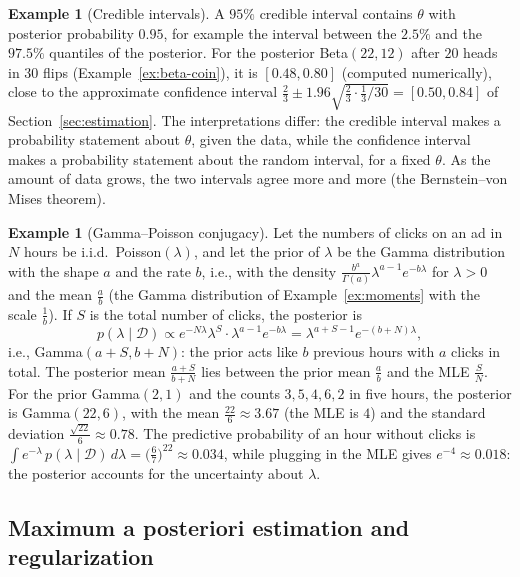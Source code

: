 \documentclass[11pt]{article}
\theoremstyle{definition}
\newtheorem{example}[definition]{Example}
\theoremstyle{plain}
\theoremstyle{remark}
\begin{document}
\begin{example}[Credible intervals]\label{ex:credible}
    A $95\%$ credible interval contains $\theta$ with posterior probability $0.95$, for example the interval between the $2.5\%$ and the $97.5\%$ quantiles of the posterior. For the posterior Beta$(22, 12)$ after $20$ heads in $30$ flips (Example~\ref{ex:beta-coin}), it is $[0.48, 0.80]$ (computed numerically), close to the approximate confidence interval $\frac{2}{3} \pm 1.96\sqrt{\frac{2}{3} \cdot \frac{1}{3}/30} = [0.50, 0.84]$ of Section~\ref{sec:estimation}. The interpretations differ: the credible interval makes a probability statement about $\theta$, given the data, while the confidence interval makes a probability statement about the random interval, for a fixed $\theta$. As the amount of data grows, the two intervals agree more and more (the Bernstein--von Mises theorem).
\end{example}

\begin{example}[Gamma--Poisson conjugacy]\label{ex:gamma-poisson}
    Let the numbers of clicks on an ad in $N$ hours be i.i.d.\ Poisson$(\lambda)$, and let the prior of $\lambda$ be the Gamma distribution with the shape $a$ and the rate $b$, i.e., with the density $\frac{b^a}{\Gamma(a)}\lambda^{a-1}e^{-b\lambda}$ for $\lambda > 0$ and the mean $\frac{a}{b}$ (the Gamma distribution of Example~\ref{ex:moments} with the scale $\frac{1}{b}$). If $S$ is the total number of clicks, the posterior is
    \[p(\lambda \mid \mathcal{D}) \propto e^{-N\lambda}\lambda^S \cdot \lambda^{a-1}e^{-b\lambda} = \lambda^{a + S - 1}e^{-(b + N)\lambda},\]
    i.e., Gamma$(a + S, b + N)$: the prior acts like $b$ previous hours with $a$ clicks in total. The posterior mean $\frac{a + S}{b + N}$ lies between the prior mean $\frac{a}{b}$ and the MLE $\frac{S}{N}$. For the prior Gamma$(2, 1)$ and the counts $3, 5, 4, 6, 2$ in five hours, the posterior is Gamma$(22, 6)$, with the mean $\frac{22}{6} \approx 3.67$ (the MLE is $4$) and the standard deviation $\frac{\sqrt{22}}{6} \approx 0.78$. The predictive probability of an hour without clicks is $\int e^{-\lambda}\,p(\lambda \mid \mathcal{D})\, d\lambda = \big(\frac{6}{7}\big)^{22} \approx 0.034$, while plugging in the MLE gives $e^{-4} \approx 0.018$: the posterior accounts for the uncertainty about $\lambda$.
\end{example}

\subsection{Maximum a posteriori estimation and regularization}
\end{document}
